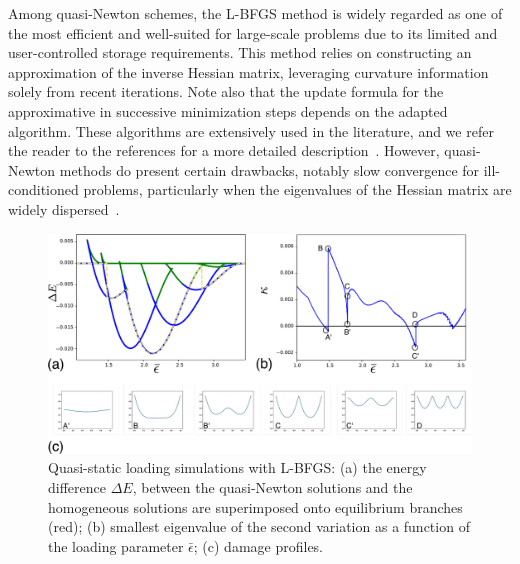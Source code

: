 Among quasi-Newton schemes, the L-BFGS method is widely regarded as one of the most efficient and well-suited for large-scale problems due to its limited and user-controlled storage requirements. This method relies on constructing an approximation of the inverse Hessian matrix, leveraging curvature information solely from recent iterations. Note also that the update formula for the approximative in successive minimization steps depends on the adapted algorithm. These algorithms are extensively used in the literature, and we refer the reader to the references for a more detailed description~\cite{Matthies1979-gl,Xu2001-ax,Nocedal1999-zr,Nocedal2006-qh,Simone2012-tx,Lewis2013-eu,Curtis2015-wp}. However, quasi-Newton methods do present certain drawbacks, notably slow convergence for ill-conditioned problems, particularly when the eigenvalues of the Hessian matrix are widely dispersed~\cite{Simone2012-tx}.
\begin{figure}
\includegraphics[scale=0.23]{final_images/fig5.pdf}
    \caption{
        Quasi-static loading simulations with L-BFGS: (a) the energy difference $\Delta E$, between the quasi-Newton solutions and the homogeneous solutions are superimposed onto equilibrium branches (red); (b) smallest eigenvalue of the second variation  as a function of the loading parameter $\bar\epsilon$; (c) damage profiles.}
    \label{fig:tempo2}
\end{figure}


